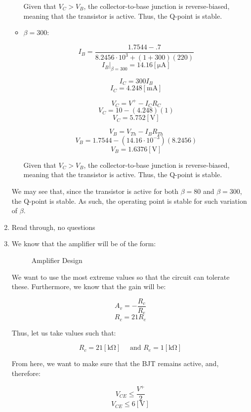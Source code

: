 \begin{enumerate}
\begin{itemize}
        Given that $V_C>V_B$, the collector-to-base junction is reverse-biased, meaning that the transistor is active. Thus, the Q-point is stable.

      \item $\beta=300$:

        $$I_B=\frac{1.7544-.7}{8.2456\cdot10^3+(1+300)(220)}$$
        $$\boxed{I_B\Big|_{\beta=300}=14.16[\si{\micro\ampere}]}$$

        $$I_C=300I_B$$
        $$\boxed{I_C=4.248[\si{\milli\ampere}]}$$

        $$V_C=V^+-I_CR_C$$
        $$V_C=10-(4.248)(1)$$
        $$\boxed{V_C=5.752[\si{\volt}]}$$

        $$V_B=V_{Th}-I_BR_{Th}$$
        $$V_B=1.7544-(14.16\cdot10^{-3})(8.2456)$$
        $$\boxed{V_B=1.6376[\si{\volt}]}$$

        Given that $V_C>V_B$, the collector-to-base junction is reverse-biased, meaning that the transistor is active. Thus, the Q-point is stable.

    \end{itemize}

    We may see that, since the transistor is active for both $\beta=80$ and $\beta=300$, the Q-point is stable. As such, the operating point is stable for such variation of $\beta$.

  \item Read through, no questions \textcolor{green}{\checkmark}

  \item We know that the amplifier will be of the form:

    \begin{figure}[H]
      \centering
      
      \caption{Amplifier Design}
      \label{fig:3}
    \end{figure}

    We want to use the most extreme values so that the circuit can tolerate these. Furthermore, we know that the gain will be:

    $$A_v=-\frac{R_c}{R_e}$$
    $$R_c=21R_e$$

    Thus, let us take values such that:

    $$R_c=21[\si{\kilo\ohm}]\quad\text{ and }R_e=1[\si{\kilo\ohm}]$$

    From here, we want to make sure that the BJT remains active, and, therefore:

    $$V_{CE}\leq \frac{V^+}{2}$$
    $$V_{CE}\leq 6[\si{\volt}]$$


\end{enumerate}
